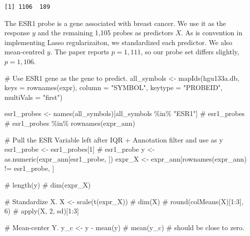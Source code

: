 \documentclass[
  letterpaper,
  DIV=11,
  numbers=noendperiod]{scrartcl}
\newenvironment{Shaded}{\begin{snugshade}}{\end{snugshade}}
\newcommand{\AttributeTok}[1]{\textcolor[rgb]{0.40,0.45,0.13}{#1}}
\newcommand{\CommentTok}[1]{\textcolor[rgb]{0.37,0.37,0.37}{#1}}
\newcommand{\DecValTok}[1]{\textcolor[rgb]{0.68,0.00,0.00}{#1}}
\newcommand{\FunctionTok}[1]{\textcolor[rgb]{0.28,0.35,0.67}{#1}}
\newcommand{\NormalTok}[1]{\textcolor[rgb]{0.00,0.23,0.31}{#1}}
\newcommand{\OtherTok}[1]{\textcolor[rgb]{0.00,0.23,0.31}{#1}}
\newcommand{\SpecialCharTok}[1]{\textcolor[rgb]{0.37,0.37,0.37}{#1}}
\newcommand{\StringTok}[1]{\textcolor[rgb]{0.13,0.47,0.30}{#1}}
\begin{document}
\begin{verbatim}
[1] 1106  189
\end{verbatim}

The ESR1 probe is a gene associated with breast cancer. We use it as the
response \(y\) and the remaining 1,105 probes as predictors \(X\). As is
convention in implementing Lasso regularizaiton, we standardized each
predictor. We also mean-centred \(y\). The paper reports
\(p = 1{,}111\), so our probe set differs slightly, \(p = 1{,}106\).

\begin{Shaded}
\begin{Highlighting}[]
\CommentTok{\# Use ESR1 gene as the gene to predict.}
\NormalTok{all\_symbols }\OtherTok{\textless{}{-}} \FunctionTok{mapIds}\NormalTok{(hgu133a.db,}
                      \AttributeTok{keys =} \FunctionTok{rownames}\NormalTok{(expr),}
                      \AttributeTok{column =} \StringTok{"SYMBOL"}\NormalTok{,}
                      \AttributeTok{keytype =} \StringTok{"PROBEID"}\NormalTok{,}
                      \AttributeTok{multiVals =} \StringTok{"first"}\NormalTok{)}

\NormalTok{esr1\_probes }\OtherTok{\textless{}{-}} \FunctionTok{names}\NormalTok{(all\_symbols)[all\_symbols }\SpecialCharTok{\%in\%} \StringTok{"ESR1"}\NormalTok{]}
\CommentTok{\# esr1\_probes}
\CommentTok{\# esr1\_probes \%in\% rownames(expr\_ann)}

\CommentTok{\# Pull the ESR Variable left after IQR + Annotation filter and use as y}
\NormalTok{esr1\_probe }\OtherTok{\textless{}{-}}\NormalTok{ esr1\_probes[}\DecValTok{1}\NormalTok{]}
\CommentTok{\# esr1\_probe}
\NormalTok{y }\OtherTok{\textless{}{-}} \FunctionTok{as.numeric}\NormalTok{(expr\_ann[esr1\_probe, ])}
\NormalTok{expr\_X }\OtherTok{\textless{}{-}}\NormalTok{ expr\_ann[}\FunctionTok{rownames}\NormalTok{(expr\_ann) }\SpecialCharTok{!=}\NormalTok{ esr1\_probe, ]}

\CommentTok{\# length(y)}
\CommentTok{\# dim(expr\_X)}

\CommentTok{\# Standardize X.}
\NormalTok{X }\OtherTok{\textless{}{-}} \FunctionTok{scale}\NormalTok{(}\FunctionTok{t}\NormalTok{(expr\_X))}
\CommentTok{\# dim(X)}
\CommentTok{\# round(colMeans(X)[1:3], 6)}
\CommentTok{\# apply(X, 2, sd)[1:3]}

\CommentTok{\# Mean{-}center Y.}
\NormalTok{y\_c }\OtherTok{\textless{}{-}}\NormalTok{ y }\SpecialCharTok{{-}} \FunctionTok{mean}\NormalTok{(y)}
\CommentTok{\# mean(y\_c) \# should be close to zero.}
\end{Highlighting}
\end{Shaded}
\end{document}
